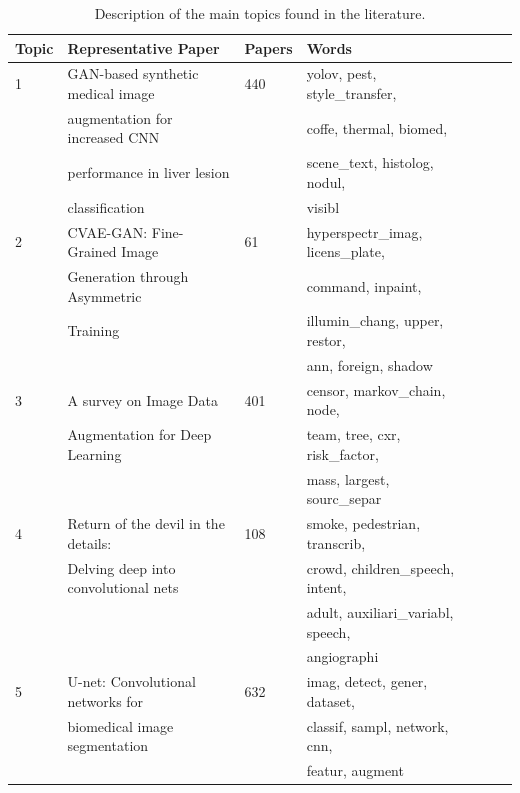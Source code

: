 \documentclass[parskip=full]{scrartcl}
\begin{document}
\begin{table}[ht]
    \begin{center}
    \caption{\label{tab:topic_analysis}
        Description of the main topics found in the literature.
    }
    \begin{tabular*}{\textwidth}{@{\extracolsep{\fill}}lllllll@{\extracolsep{\fill}}}
        \toprule
        Topic & Representative Paper & Papers & Words\\
        \midrule
        1 & GAN-based synthetic medical image & 440 & yolov, pest, style\_transfer, \\
          & augmentation for increased CNN && coffe, thermal, biomed, \\
          & performance in liver lesion && scene\_text, histolog, nodul, \\
        \vspace{.2cm}& classification && visibl \\
        
        2 & CVAE-GAN: Fine-Grained Image & 61 & hyperspectr\_imag, licens\_plate, \\
          & Generation through Asymmetric && command, inpaint, \\
          & Training && illumin\_chang, upper, restor, \\
        \vspace{.2cm}  &&& ann, foreign, shadow \\
        
        3 & A survey on Image Data & 401 & censor, markov\_chain, node, \\ 
          & Augmentation for Deep Learning && team, tree, cxr, risk\_factor, \\
        \vspace{.2cm}  &&&mass, largest, sourc\_separ\\
        
        4 & Return of the devil in the details: & 108 & smoke, pedestrian, transcrib, \\
          & Delving deep into convolutional nets && crowd, children\_speech, intent, \\
          &&&adult, auxiliari\_variabl, speech, \\
        \vspace{.2cm}  &&&angiographi \\
        
        5 & U-net: Convolutional networks for & 632 & imag, detect, gener, dataset, \\
          & biomedical image segmentation && classif, sampl, network, cnn, \\
        \vspace{.2cm}  &&&featur, augment\\
        

\end{tabular*}
\end{center}
\end{table}
\end{document}

